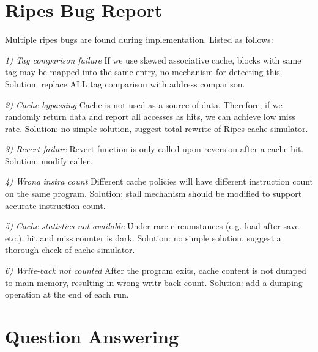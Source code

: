 \documentclass[utf8]{article}
\begin{document}

\section{Ripes Bug Report}
Multiple ripes bugs are found during implementation. Listed as follows:

\noindent
\emph{1) Tag comparison failure } If we use skewed associative cache, blocks with same tag may be mapped into the same entry, no mechanism for detecting this. Solution: replace ALL tag comparison with address comparison.

\noindent
\emph{2) Cache bypassing } Cache is not used as a source of data. Therefore, if we randomly return data and report all accesses as hits, we can achieve low miss rate. Solution: no simple solution, suggest total rewrite of Ripes cache simulator.

\noindent
\emph{3) Revert failure } Revert function is only called upon reversion after a cache hit. Solution: modify caller.

\noindent
\emph{4) Wrong instra count } Different cache policies will have different instruction count on the same program. Solution: stall mechanism should be modified to support accurate instruction count.

\noindent
\emph{5) Cache statistics not available} Under rare circumstances (e.g. load after save etc.), hit and miss counter is dark. Solution: no simple solution, suggest a thorough check of cache simulator.

\noindent
\emph{6) Write-back not counted} After the program exits, cache content is not dumped to main memory, resulting in wrong writr-back count. Solution: add a dumping operation at the end of each run. 

\section{Question Answering}
\end{document}
